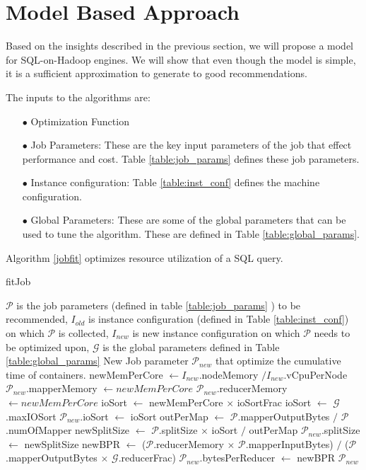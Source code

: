 \section{Model Based Approach}
\label{sec:modelbased}
Based on the insights described in the previous section, we will propose a model for SQL-on-Hadoop engines. We will show that even though the model is simple, it is a sufficient approximation to generate to good recommendations. 

The inputs to the algorithms are:
\begin{enumerate}
    \item[$\bullet$] Optimization Function  
    \item[$\bullet$] Job Parameters: These are the key input parameters of the job that effect performance and cost. Table \ref{table:job_params} defines these job parameters.
    \item[$\bullet$] Instance configuration: Table \ref{table:inst_conf} defines the machine configuration.
    \item[$\bullet$] Global Parameters: These are some of the global parameters that can be used to tune the algorithm. These are defined in Table \ref{table:global_params}.
\end{enumerate}

Algorithm \ref{jobfit} optimizes resource utilization of a SQL query. 

\renewcommand{\algorithmicrequire}{\textbf{Input:}}
\renewcommand{\algorithmicensure}{\textbf{Output:}}
\renewcommand{\algorithmiccomment}[1]{// #1}
\begin{algorithm}
\caption{fitJob}\label{jobfit}
\begin{algorithmic}[1]
\footnotesize
\REQUIRE  $\mathcal{P}$ is the job parameters (defined in table \ref{table:job_params} ) to be recommended, $I_{old}$  is instance configuration (defined in Table \ref{table:inst_conf}) on which $\mathcal{P}$ is collected, $I_{new}$ is new instance configuration on which $\mathcal{P}$ needs to be optimized upon, $\mathcal{G}$ is the global parameters defined in Table \ref{table:global_params}
\ENSURE New Job parameter $\mathcal{P}_{new}$ that optimize the cumulative time of containers.
\STATE newMemPerCore $\gets I_{new}$.nodeMemory $/ I_{new}$.vCpuPerNode
\STATE $\mathcal{P}_{new}$.mapperMemory $\gets newMemPerCore$
\STATE $\mathcal{P}_{new}$.reducerMemory $\gets newMemPerCore$
\STATE ioSort $\gets$ newMemPerCore $\times$ ioSortFrac
\STATE ioSort $\gets$ $\mathcal{G}$.maxIOSort
\ENDIF
\STATE $\mathcal{P}_{new}$.ioSort $\gets$ ioSort
\STATE outPerMap $\gets$ $\mathcal{P}$.mapperOutputBytes $/$ $\mathcal{P}$.numOfMapper
\STATE newSplitSize $\gets$ $\mathcal{P}$.splitSize $\times$ ioSort $/$ outPerMap
\STATE $\mathcal{P}_{new}$.splitSize $\gets$ newSplitSize
\STATE newBPR $\gets$ ($\mathcal{P}$.reducerMemory $\times$ $\mathcal{P}$.mapperInputBytes) $/$ ($\mathcal{P}$.mapperOutputBytes $\times$ $\mathcal{G}$.reducerFrac)  
\STATE $\mathcal{P}_{new}$.bytesPerReducer $\gets$ newBPR
\STATE \RETURN $\mathcal{P}_{new}$
\end{algorithmic}
\end{algorithm}

